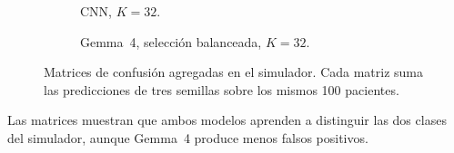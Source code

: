 \begin{figure}[H]
  \centering
  \begin{subfigure}{0.42\textwidth}
    \centering
    \caption{CNN, \(K=32\).}
  \end{subfigure}
  \hfill
  \begin{subfigure}{0.42\textwidth}
    \centering
    \caption{Gemma~4, selección balanceada, \(K=32\).}
  \end{subfigure}
  \caption{Matrices de confusión agregadas en el simulador. Cada matriz suma las predicciones de tres semillas sobre los mismos 100 pacientes.}
  \label{fig:simulator_confusions}
\end{figure}

Las matrices muestran que ambos modelos aprenden a distinguir las dos clases del simulador, aunque Gemma~4 produce menos falsos positivos.


